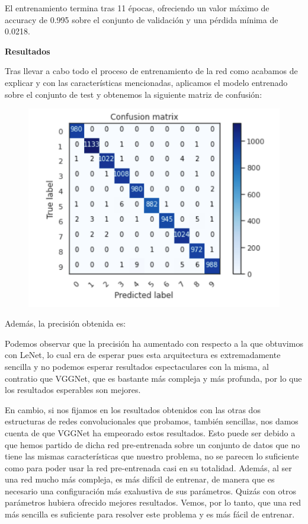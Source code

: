 \documentclass[a4paper,11pt]{article}
\begin{document}
El entrenamiento termina tras 11 épocas, ofreciendo un valor máximo de accuracy de 0.995 sobre el conjunto de validación y una pérdida mínima de 0.0218. 

\textbf{Resultados}

Tras llevar a cabo todo el proceso de entrenamiento de la red como acabamos de explicar y con las características mencionadas, aplicamos el modelo entrenado sobre el conjunto de test y obtenemos la siguiente matriz de confusión:
\begin{figure}[H]
	\centering
	\includegraphics[width=0.8\linewidth]{img/vgg5}
	\caption{}
	\label{fig:vgg5}
\end{figure}

Además, la precisión obtenida es: 

Podemos observar que la precisión ha aumentado con respecto a la que obtuvimos con LeNet, lo cual era de esperar pues esta arquitectura es extremadamente sencilla y no podemos esperar resultados espectaculares con la misma, al contratio que VGGNet, que es bastante más compleja y más profunda, por lo que los resultados esperables son mejores. 

En cambio, si nos fijamos en los resultados obtenidos con las otras dos estructuras de redes convolucionales que probamos, también sencillas, nos damos cuenta de que VGGNet ha empeorado estos resultados. Esto puede ser debido a que hemos partido de dicha red pre-entrenada sobre un conjunto de datos que no tiene las mismas características que nuestro problema, no se parecen lo suficiente como para poder usar la red pre-entrenada casi en su totalidad. Además, al ser una red mucho más compleja, es más difícil de entrenar, de manera que es necesario una configuración más exahustiva de sus parámetros. Quizás con otros parámetros hubiera ofrecido mejores resultados. Vemos, por lo tanto, que una red más sencilla es suficiente para resolver este problema y es más fácil de entrenar. 
\end{document}
